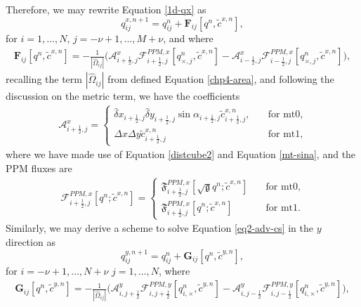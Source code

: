 Therefore, we may rewrite Equation \eqref{1d-qx} as
\begin{equation}
q^{x,n+1}_{ij} = q^{n}_{ij} + \mathbf{F}_{ij}[{q^n,\tilde{c}^{x,n}}],
\end{equation}
for $i=1, \ldots, N$, $j=-\nu+1, \ldots, M + \nu$, and where
\begin{align*}
	\mathbf{F}_{ij}[{q^n,\tilde{c}^{x,n}}] = 
	-\frac{1}{|\hat{\Omega}_{ij}|}
	\bigg(\mathcal{A}_{i+\frac{1}{2},j}^{x} \mathcal{F}_{i+\frac{1}{2},j}^{PPM,x}[q^n_{\times,j},\tilde{c}^{x,n}]-
	\mathcal{A}_{i-\frac{1}{2},j}^{x} \mathcal{F}_{i-\frac{1}{2},j}^{PPM,x}[q^n_{\times,j},\tilde{c}^{x,n}] \bigg),
\end{align*}
recalling the term $|\hat{\Omega}_{ij}|$ from defined Equation \eqref{chp4-area},
and following the discussion on the metric term, we have the coefficients
\begin{align}
	\label{ax-def}
	\mathcal{A}_{i+\frac{1}{2},j}^x= 
	\begin{cases}
		\hat{\delta} x_{i+\frac{1}{2},j}  \hat{\delta} y_{i+\frac{1}{2},j} 
		\sin{\alpha_{i+\frac{1}{2},j}}
		{\tilde{c}}_{i+\frac{1}{2},j}^{x,n},
		\quad &\text{for mt0},\\
		{\Delta x}{\Delta y}{\tilde{c}}_{i+\frac{1}{2},j}^{x,n}
		\quad &\text{for mt1},
	\end{cases}
\end{align}
where we have made use of Equation \eqref{distcube2} and Equation \eqref{mt-sina}, 
and the PPM fluxes are
\begin{align}
	\label{ppmx-flux}
	\mathcal{F}_{i+\frac{1}{2},j}^{PPM,x} [{{q}^n;\tilde{c}^{x,n}}] = 
	\begin{cases}
		\mathfrak{F}_{i+\frac{1}{2},j}^{PPM,x}[{{\sqrt{\mathfrak{g}}q}^n;\tilde{c}^{x,n}}]
		\quad &\text{for mt0},\\
		\mathfrak{F}_{i+\frac{1}{2},j}^{PPM,x}[{{q}^n;\tilde{c}^{x,n}}]
		\quad &\text{for mt1}.
	\end{cases}
\end{align}
Similarly, we may derive a scheme to solve Equation \eqref{eq2-adv-cs} in the $y$ direction as
\begin{equation}
	q^{y,n+1}_{ij} = q^{n}_{ij} + \mathbf{G}_{ij}[{q^n,\tilde{c}^{y,n}}],
\end{equation}
for $i=-\nu+1, \ldots, N + \nu$  $j=1, \ldots, N$, where
\begin{align*}
	\mathbf{G}_{ij}[{q^n,\tilde{c}^{y,n}}] = 
	-\frac{1}{|\hat{\Omega}_{ij}|}
	\bigg(\mathcal{A}_{i,j+\frac{1}{2}}^{y} \mathcal{F}_{i,j+\frac{1}{2}}^{PPM,y}[q^n_{i,\times},\tilde{c}^{y,n}]-
	\mathcal{A}_{i,j-\frac{1}{2}}^{y} \mathcal{F}_{i,j-\frac{1}{2}}^{PPM,y}[q^n_{i,\times},\tilde{c}^{y,n}] \bigg),
\end{align*}
